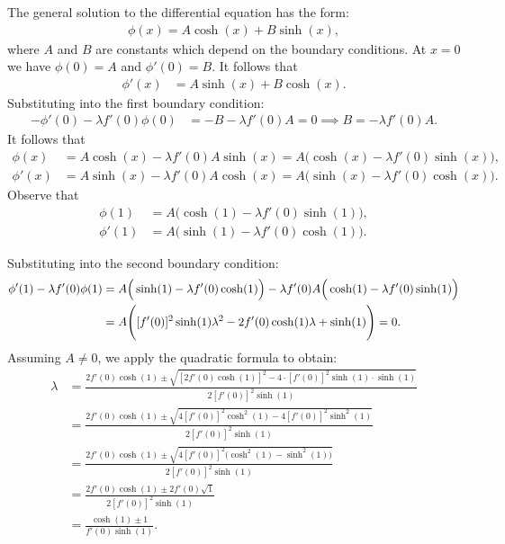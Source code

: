 \documentclass[12pt, reqno]{amsart}
\numberwithin{equation}{section}
\begin{document}
The general solution to the differential equation has the form:
\begin{align*}
    \phi(x) = A \cosh(x) + B \sinh(x),
\end{align*}
where \(A\) and \(B\) are constants which depend on the boundary conditions. At $x = 0$ we have $\phi(0) = A$ and $\phi'(0) = B$.
It follows that
\begin{align*}
    \phi'(x) &= A \sinh(x) + B \cosh(x).
\end{align*}
Substituting into the first boundary condition:
\begin{align*}
-\phi'(0) - \lambda f'(0) \phi(0)
    &= -B - \lambda f'(0) A 
    = 0 \implies B = -\lambda f'(0) A.
\end{align*}
It follows that
\begin{align*}
    \phi(x) &= A \cosh(x) - 
             \lambda f'(0) A \sinh(x) 
            = A \Big( \cosh(x) - \lambda
              f'(0) \sinh(x) \Big), \\
    \phi'(x) &= A \sinh(x) -
                \lambda f'(0) A \cosh(x)
             = A \Big( \sinh(x) - \lambda 
               f'(0) \cosh(x) \Big).
\end{align*}    
Observe that 
\begin{align*}
\phi(1) 
    &= A \Big( \cosh(1) - \lambda f'(0) 
       \sinh(1) \Big), \\
\phi'(1) 
    &= A \Big( \sinh(1) - \lambda f'(0) \cosh(1) \Big).
\end{align*}

Substituting into the second boundary condition:
\begin{align} \label{solve_for_lambda1}
\phi'(1) - \lambda f'(0) \phi(1)
    &= A \Big( \sinh(1) - \lambda f'(0) \cosh(1) \Big) - \lambda f'(0) \notag 
    A \Big( \cosh(1) - \lambda f'(0) 
       \sinh(1) \Big) \notag \\
    &= A \Bigg( [f'(0)]^2 \sinh(1) \lambda^2  - 2 f'(0) \cosh(1) \lambda 
    + \sinh(1) \Bigg) = 0.
\end{align}
Assuming \(A \neq 0\), we apply the quadratic formula to obtain:
\begin{align*}
\lambda 
    &= \frac{2 f'(0) \cosh(1) \pm \sqrt{[2 f'(0) \cosh(1)]^2 - 4 \cdot [f'(0)]^2 \sinh(1) \cdot \sinh(1)}}{2 [f'(0)]^2 \sinh(1)} \\[2ex]
    &= \frac{2 f'(0) \cosh(1) \pm 
       \sqrt{4 [f'(0)]^2 \cosh^2(1) -
       4 [f'(0)]^2 \sinh^2(1)}}
       {2 [f'(0)]^2 \sinh(1)} \\[2ex]
    &= \frac{2 f'(0) \cosh(1) \pm 
       \sqrt{4 [f'(0)]^2 \Big( \cosh^2(1) -
       \sinh^2(1) \Big)}}
       {2 [f'(0)]^2 \sinh(1)} \\[2ex]
    &= \frac{2 f'(0) \cosh(1) \pm 
       2 f'(0) \sqrt{1}}
       {2 [f'(0)]^2 \sinh(1)} \\[2ex]
    &= \frac{\cosh(1) \pm 1}{f'(0) \sinh(1)}.
\end{align*}
\end{document}
